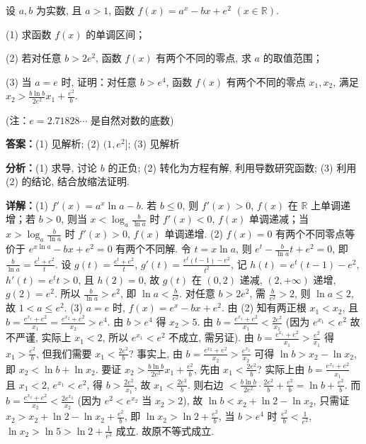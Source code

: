\begin{question}[points=15]
设 $a,b$ 为实数, 且 $a>1$, 函数 $f(x)=a^x - bx + e^2$ $(x\in\mathbb{R})$.

(1) 求函数 $f(x)$ 的单调区间；

(2) 若对任意 $b>2e^2$, 函数 $f(x)$ 有两个不同的零点, 求 $a$ 的取值范围；

(3) 当 $a=e$ 时, 证明：对任意 $b>e^4$, 函数 $f(x)$ 有两个不同的零点 $x_1,x_2$, 满足 $x_2 > \frac{b\ln b}{2e^2} x_1 + \frac{e^2}{b}$.

(注：$e=2.71828\cdots$ 是自然对数的底数)
\begin{solution}
\textbf{答案：}(1) 见解析; (2) $(1,e^2]$; (3) 见解析

\textbf{分析：}(1) 求导, 讨论 $b$ 的正负; (2) 转化为方程有解, 利用导数研究函数; (3) 利用 (2) 的结论, 结合放缩法证明.

\textbf{详解：}(1) $f'(x)=a^x\ln a - b$. 若 $b\leq0$, 则 $f'(x)>0$, $f(x)$ 在 $\mathbb{R}$ 上单调递增；若 $b>0$, 则当 $x<\log_a\frac{b}{\ln a}$ 时 $f'(x)<0$, $f(x)$ 单调递减；当 $x>\log_a\frac{b}{\ln a}$ 时 $f'(x)>0$, $f(x)$ 单调递增.
(2) $f(x)=0$ 有两个不同零点等价于 $e^{x\ln a} - bx + e^2=0$ 有两个不同解. 令 $t=x\ln a$, 则 $e^t - \frac{b}{\ln a}t + e^2=0$, 即 $\frac{b}{\ln a} = \frac{e^t+e^2}{t}$. 设 $g(t)=\frac{e^t+e^2}{t}$, $g'(t)=\frac{e^t(t-1)-e^2}{t^2}$, 记 $h(t)=e^t(t-1)-e^2$, $h'(t)=e^t t>0$, 且 $h(2)=0$, 故 $g(t)$ 在 $(0,2)$ 递减, $(2,+\infty)$ 递增, $g(2)=e^2$. 所以 $\frac{b}{\ln a} > e^2$, 即 $\ln a < \frac{b}{e^2}$. 对任意 $b>2e^2$, 需 $\frac{b}{e^2}>2$, 则 $\ln a \leq 2$, 故 $1<a\leq e^2$.
(3) $a=e$ 时, $f(x)=e^x - bx + e^2$. 由 (2) 知有两正根 $x_1<x_2$, 且 $b=\frac{e^{x_1}+e^2}{x_1} = \frac{e^{x_2}+e^2}{x_2} > e^4$. 由 $b>e^4$ 得 $x_2>5$. 由 $b=\frac{e^{x_1}+e^2}{x_1} < \frac{2e^2}{x_1}$ (因为 $e^{x_1}<e^2$ 故不严谨, 实际上 $x_1<2$, 所以 $e^{x_1}<e^2$ 不成立, 需另证). 由 $b=\frac{e^{x_1}+e^2}{x_1} > \frac{e^2}{x_1}$ 得 $x_1 > \frac{e^2}{b}$, 但我们需要 $x_1<\frac{2e^2}{b}$? 事实上, 由 $b=\frac{e^{x_2}+e^2}{x_2} > \frac{e^{x_2}}{x_2}$ 可得 $\ln b > x_2 - \ln x_2$, 即 $x_2 < \ln b + \ln x_2$. 要证 $x_2 > \frac{b\ln b}{2e^2}x_1 + \frac{e^2}{b}$, 先由 $x_1 < \frac{2e^2}{b}$? 实际上由 $b=\frac{e^{x_1}+e^2}{x_1}$ 且 $x_1<2$, $e^{x_1}<e^2$, 得 $b>\frac{2e^2}{x_1}$, 故 $x_1<\frac{2e^2}{b}$. 则右边 $< \frac{b\ln b}{2e^2}\cdot\frac{2e^2}{b}+\frac{e^2}{b} = \ln b + \frac{e^2}{b}$. 而 $b = \frac{e^{x_2}+e^2}{x_2} < \frac{2e^{x_2}}{x_2}$ (因为 $e^2<e^{x_2}$ 当 $x_2>2$), 故 $\ln b < x_2 + \ln2 - \ln x_2$, 只需证 $x_2 > x_2 + \ln2 - \ln x_2 + \frac{e^2}{b}$, 即 $\ln x_2 > \ln2 + \frac{e^2}{b}$, 当 $b>e^4$ 时 $\frac{e^2}{b}<\frac{1}{e^2}$, $\ln x_2 > \ln5 > \ln2 + \frac{1}{e^2}$ 成立. 故原不等式成立.
\end{solution}
\end{question}

